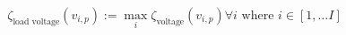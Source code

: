 \begin{equation}
	\zeta_\text{load voltage}(v_{i,p}) := \max_{i}{\zeta_\text{voltage}(v_{i,p})} \forall i \text{ where } i \in [1, \dots I]
	\label{ch1:equ:load-voltage-deviation}
\end{equation}
